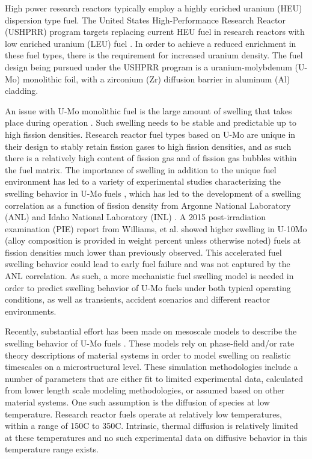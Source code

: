 \documentclass[review]{elsarticle}
\begin{document}
High power research reactors typically employ a highly enriched uranium (HEU) dispersion type fuel. The United States High-Performance Research Reactor (USHPRR) program targets replacing current HEU fuel in research reactors with low enriched uranium (LEU) fuel \cite{snelgrove1997}. In order to achieve a reduced enrichment in these fuel types, there is the requirement for increased uranium density. The fuel design being pursued under the USHPRR program is a uranium-molybdenum (U-Mo) monolithic foil, with a zirconium (Zr) diffusion barrier in aluminum (Al) cladding.

An issue with U-Mo monolithic fuel is the large amount of swelling that takes place during operation \cite{hofman1997}. Such swelling needs to be stable and predictable up to high fission densities. Research reactor fuel types based on U-Mo are unique in their design to stably retain fission gases to high fission densities, and as such there is a relatively high content of fission gas and of fission gas bubbles within the fuel matrix. The importance of swelling in addition to the unique fuel environment has led to a variety of experimental studies characterizing the swelling behavior in U-Mo fuels \cite{rest2009, kim_anl08, meyer2002, kim2013}, which has led to the development of a swelling correlation as a function of fission density from Argonne National Laboratory (ANL) \cite{kim2011} and Idaho National Laboratory (INL) \cite{umo_prelim_report2017}. A 2015 post-irradiation examination (PIE) report \cite{afip6report} from Williams, et al. showed higher swelling in U-10Mo (alloy composition is provided in weight percent unless otherwise noted) fuels at fission densities much lower than previously observed. This accelerated fuel swelling behavior could lead to early fuel failure and was not captured by the ANL correlation. As such, a more mechanistic fuel swelling model is needed in order to predict swelling behavior of U-Mo fuels under both typical operating conditions, as well as transients, accident scenarios and different reactor environments.

Recently, substantial effort has been made on mesoscale models to describe the swelling behavior of U-Mo fuels \cite{liang2018, liang2018a, liang2017, liang2016, ye2018, hu2017a, hu2016, hu2016a}. These models rely on phase-field and/or rate theory descriptions of material systems in order to model swelling on realistic timescales on a microstructural level. These simulation methodologies include a number of parameters that are either fit to limited experimental data, calculated from lower length scale modeling methodologies, or assumed based on other material systems. One such assumption is the diffusion of species at low temperature. Research reactor fuels operate at relatively low temperatures, within a range of 150\degree C to 350\degree C. Intrinsic, thermal diffusion is relatively limited at these temperatures and no such experimental data on diffusive behavior in this temperature range exists. 
\end{document}
